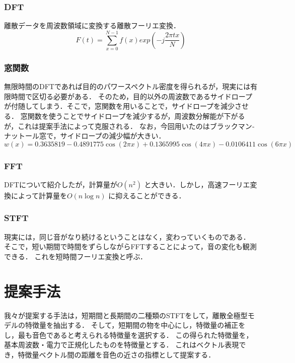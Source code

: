 \documentclass[uplatex,a4paper,11pt]{jsarticle}
\begin{document}
\subsubsection{DFT}
離散データを周波数領域に変換する離散フーリエ変換．
\begin{displaymath}
  F(t) = \sum^{N-1}_{x=0} f(x)exp(-j \frac{2\pi tx}{N})  
\end{displaymath}

\subsubsection{窓関数}
無限時間のDFTであれば目的のパワースペクトル密度を得られるが，現実には有限時間で区切る必要がある．
そのため，目的以外の周波数であるサイドロープが付随してしまう．そこで，窓関数を用いることで，サイドロープを減少させる．
窓関数を使うことでサイドロープを減少するが，周波数分解能が下がるが，これは提案手法によって克服される．
なお，今回用いたのはブラックマン‐ナットール窓で，サイドロープの減少幅が大きい．
\begin{displaymath}
  w(x)=0.3635819-0.4891775\cos (2\pi x) +0.1365995\cos (4\pi x)-0.0106411\cos (6\pi x)
\end{displaymath}

\subsubsection{FFT}
DFTについて紹介したが，計算量が\begin{math}
  O(n^2)
\end{math}
と大きい．しかし，高速フーリエ変換によって計算量を\begin{math}
  O(n \log n)
\end{math}
に抑えることができる．

\subsubsection{STFT}
現実には，同じ音がなり続けるということはなく，変わっていくものである．
そこで，短い期間で時間をずらしながらFFTすることによって，音の変化も観測できる．
これを短時間フーリエ変換と呼ぶ．

\section{提案手法}
我々が提案する手法は，短期間と長期間の二種類のSTFTをして，離散全極型モデルの特徴量を抽出する．
そして，短期間の物を中心にし，特徴量の補正をし，最も音色であると考えられる特徴量を選択する．
この得られた特徴量を，基本周波数・電力で正規化したものを特徴量とする．
これはベクトル表現でき，特徴量ベクトル間の距離を音色の近さの指標として提案する．
\end{document}
